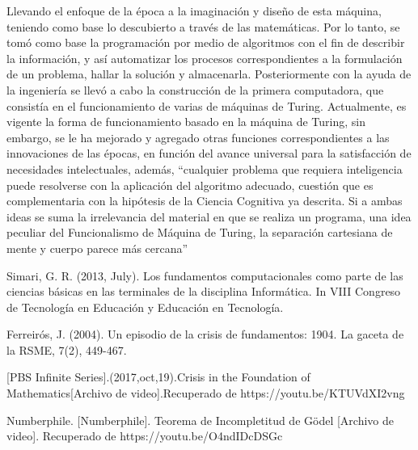 \documentclass[12pt]{article}
\begin{document}
\vspace{15PT}
Llevando el enfoque de la época a la imaginación y diseño de esta máquina, teniendo como base lo descubierto a través de las matemáticas. Por lo tanto, se tomó como base la programación por medio de algoritmos con el fin de describir la información, y así automatizar los procesos correspondientes a la formulación de un problema, hallar la  solución y almacenarla. Posteriormente con la ayuda de la ingeniería se llevó a cabo la construcción de la primera computadora, que consistía en el funcionamiento de varias de máquinas de Turing. Actualmente, es vigente la forma de funcionamiento basado en la máquina de Turing, sin embargo, se le ha mejorado y agregado otras funciones correspondientes a las innovaciones de las épocas, en función del avance universal para la satisfacción de necesidades intelectuales, además, ``cualquier problema que requiera inteligencia puede resolverse con la aplicación del algoritmo adecuado, cuestión que es complementaria con la hipótesis de la Ciencia Cognitiva ya descrita. Si a ambas ideas se suma la irrelevancia del material en que se realiza un programa, una idea peculiar del Funcionalismo de Máquina de Turing, la separación cartesiana de mente y cuerpo parece más cercana''\cite{gonzalez2011maquinas}
\newpage


\vspace{30pt}



Simari, G. R. (2013, July). Los fundamentos computacionales como parte de las ciencias básicas en las terminales de la disciplina Informática. In VIII Congreso de Tecnología en Educación y Educación en Tecnología.\vspace{15PT}

Ferreirós, J. (2004). Un episodio de la crisis de fundamentos: 1904. La gaceta de la RSME, 7(2), 449-467.\vspace{15PT}

[PBS Infinite Series].(2017,oct,19).Crisis in the Foundation of Mathematics[Archivo de video].Recuperado de https://youtu.be/KTUVdXI2vng\vspace{15PT}

Numberphile. [Numberphile]. Teorema de Incompletitud de Gödel [Archivo de video]. Recuperado de https://youtu.be/O4ndIDcDSGc
\end{document}
